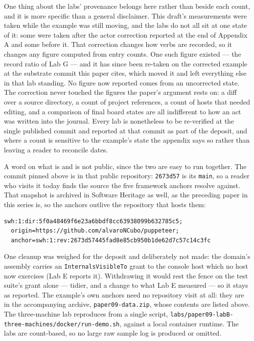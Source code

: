 \documentclass[
]{article}
\newcounter{none} %
\begin{document}
One thing about the labs' provenance belongs here rather than beside
each count, and it is more specific than a general disclaimer. This
draft's measurements were taken while the example was still moving, and
the labs do not all sit at one state of it: some were taken after the
actor correction reported at the end of Appendix A and some before it.
That correction changes how verbs are recorded, so it changes any figure
computed from entry counts. One such figure existed --- the record ratio
of Lab G --- and it has since been re-taken on the corrected example at
the substrate commit this paper cites, which moved it and left
everything else in that lab standing. No figure now reported comes from
an uncorrected state. The correction never touched the figures the
paper's argument rests on: a diff over a source directory, a count of
project references, a count of hosts that needed editing, and a
comparison of final board states are all indifferent to how an act was
written into the journal. Every lab is nonetheless to be re-verified at
the single published commit and reported at that commit as part of the
deposit, and where a count is sensitive to the example's state the
appendix says so rather than leaving a reader to reconcile dates.

A word on what is and is not public, since the two are easy to run
together. The commit pinned above is in that public repository:
\texttt{2673d57} is its \texttt{main}, so a reader who visits it today
finds the source the five framework anchors resolve against. That
snapshot is archived in Software Heritage as well, as the preceding
paper in this series is, so the anchors outlive the repository that
hosts them:

\begin{verbatim}
swh:1:dir:5f0a48469f6e23a6bbdf8cc63938099b632785c5;
  origin=https://github.com/alvaroNCubo/puppeteer;
  anchor=swh:1:rev:2673d57445fad8e85cb950b1de62d7c57c14c3fc
\end{verbatim}

One cleanup was weighed for the deposit and deliberately not made: the
domain's assembly carries an \texttt{InternalsVisibleTo} grant to the
console host which no host now exercises (Lab E reports it). Withdrawing
it would rest the fence on the test suite's grant alone --- tidier, and
a change to what Lab E measured --- so it stays as reported. The
example's own anchors need no repository visit at all: they are in the
accompanying archive, \texttt{paper09-data.zip}, whose contents are
listed above. The three-machine lab reproduces from a single script,
\texttt{labs/paper09-labB-three-machines/docker/run-demo.sh}, against a
local container runtime. The labs are count-based, so no large raw
sample log is produced or omitted.
\end{document}
